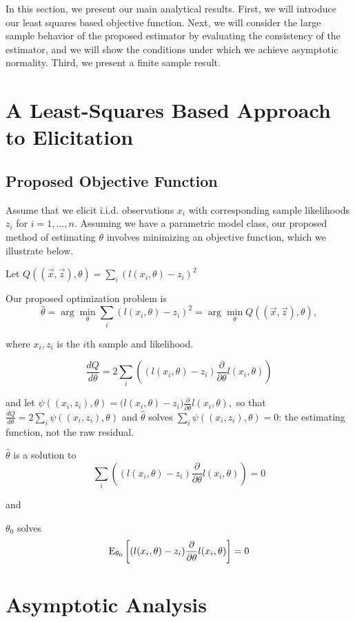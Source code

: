 In this section, we present our main analytical results. 
First, we will introduce our least squares based objective function. 
Next, we will consider the large sample behavior of the proposed estimator 
by evaluating the consistency of the estimator, and we will show the conditions under which we achieve asymptotic normality. Third, we present a finite sample result. 

\section{A Least-Squares Based Approach to Elicitation}

\subsection{Proposed Objective Function}\label{sec:objective}

Assume that we elicit i.i.d. observations $x_i$ with corresponding sample likelihoods $z_i$ for $i=1,\ldots,n$. Assuming we have a parametric model class, our proposed method of estimating $\theta$ involves minimizing an objective function, which we illustrate below.

Let $Q((\vec{x},\vec{z}),\theta)=\sum_i \left( l(x_i,\theta)-z_i \right)^2$

Our proposed optimization problem is $$
\hat{\theta} = \arg \min_{\theta} \sum_i \left( l(x_i,\theta)-z_i \right)^2 = \arg \min_{\theta} Q((\vec{x},\vec{z}), \theta),$$

where $x_i,z_i$ is the $i$th sample and likelihood.

$$\frac{dQ}{d\theta} = 2 \sum_i \left( (l(x_i,\theta)-z_i) \frac{\partial}{\partial \theta}l(x_i,\theta)\right) $$

and let $\psi((x_i,z_i),\theta)=\big(l(x_i,\theta)-z_i\big)\frac{\partial}{\partial \theta}l(x_i,\theta),$ so that $\frac{dQ}{d\theta}=2\sum_i \psi((x_i,z_i),\theta)$ and $\hat\theta$ solves $\sum_i \psi((x_i,z_i),\theta)=0$: the estimating function, not the raw residual.

$\hat{\theta}$ is a solution to $$\sum_i \left( (l(x_i,\theta)-z_i) \frac{\partial}{\partial \theta}l(x_i,\theta)\right) = 0$$

and

$\theta_0$ solves $$\mathrm{E}_{\theta_0}\left[(l(x_i,\theta)-z_i) \frac{\partial}{\partial \theta}l(x_i,\theta)\right]=0$$

\section{Asymptotic Analysis}
\label{sec:asymptotics}


